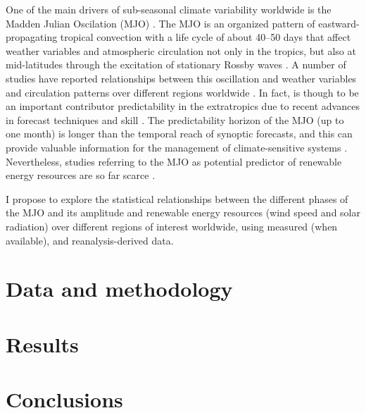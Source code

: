 \documentclass[3p, number, 11pt, sort&compress]{elsarticle}
\begin{document}
One of the main drivers of sub-seasonal climate variability worldwide is the Madden Julian Oscilation (MJO) \cite{zhang2005madden, zhang2013madden, kim2018prediction}. The MJO is an organized pattern of eastward-propagating tropical convection with a life cycle of about 40–50 days \cite{zhang2005madden, kim2018prediction} that affect weather variables and atmospheric circulation not only in the tropics, but also at mid-latitudes \cite{donald2006near} through the excitation of stationary Rossby waves \cite{seo2012global, zheng2018impacts, chen2021diversity}. A number of studies have reported relationships between this oscillation and weather variables and circulation patterns over different regions worldwide \cite{donald2006near, lin2009influence, matsueda2015global, zheng2018impacts}. In fact, is though to be an important contributor predictability in the extratropics due to recent advances in forecast techniques and skill \cite{waliser2003potential, matsueda2015global, kim2018prediction}. The predictability horizon of the MJO (up to one month) is longer than the temporal reach of synoptic forecasts, and this can provide valuable information for the management of climate-sensitive systems \cite{kim2014predictability, neena2014predictability, oliver2016predictability}. Nevertheless, studies referring to the MJO as potential predictor of renewable energy resources are so far scarce  \cite{lledo2020predicting}.

I propose to explore the statistical relationships between the different phases of the MJO and its amplitude and renewable energy resources (wind speed and solar radiation) over different regions of interest worldwide, using measured (when available), and reanalysis-derived data. 


\section{Data and methodology} \label{sec:dataandmothods}



\section{Results} \label{sec:results}



\section{Conclusions} \label{sec:conclusions}
\end{document}
